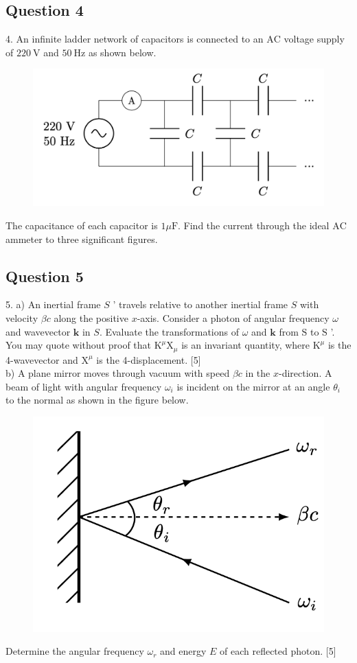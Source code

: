 \documentclass{article}
\begin{document}
\subsection{Question 4}
4. An infinite ladder network of capacitors is connected to an $\mathrm{AC}$ voltage supply of $220 \mathrm{~V}$ and $50 \mathrm{~Hz}$ as shown below.
\begin{figure}
	\centering
	\includegraphics[width=0.5\linewidth]{spho_book_TYS_images/2017q4.png}
	\caption{}
\end{figure}
The capacitance of each capacitor is $1 \mu \mathrm{F}$. Find the current through the ideal $\mathrm{AC}$ ammeter to three significant figures.

\subsection{Question 5}
5. a) An inertial frame $S$ ' travels relative to another inertial frame $S$ with velocity $\beta c$ along the positive $x$-axis. Consider a photon of angular frequency $\omega$ and wavevector $\mathbf{k}$ in $S$. Evaluate the transformations of $\omega$ and $\mathbf{k}$ from $\mathrm{S}$ to $\mathrm{S}$ '. You may quote without proof that $\mathrm{K}^{\mu} \mathrm{X}_{\mu}$ is an invariant quantity, where $\mathrm{K}^{\mu}$ is the 4-wavevector and $\mathrm{X}^{\mu}$ is the 4-displacement. [5] \\
b) A plane mirror moves through vacuum with speed $\beta c$ in the $x$-direction. A beam of light with angular frequency $\omega_{i}$ is incident on the mirror at an angle $\theta_{i}$ to the normal as shown in the figure below. 
\begin{figure}
	\centering
	\includegraphics[width=0.5\linewidth]{spho_book_TYS_images/2017q5.png}
	\caption{}
\end{figure}
Determine the angular frequency $\omega_{r}$ and energy $E$ of each reflected photon. [5]
\end{document}
